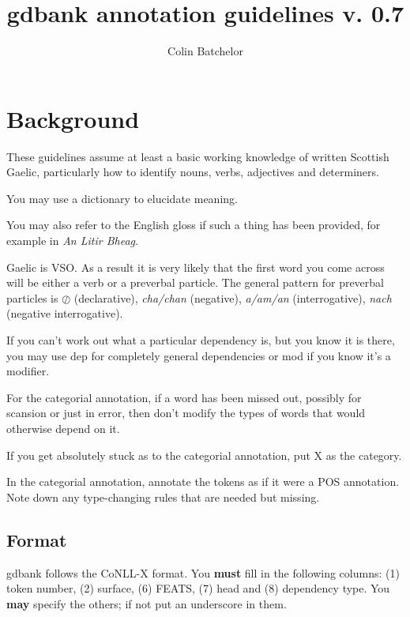 \documentclass[a4paper]{article}
\begin{document}
\title{gdbank annotation guidelines v. 0.7}
\author{Colin Batchelor}
\maketitle

\section{Background}

These guidelines assume at least a basic working knowledge of written Scottish Gaelic, particularly how to identify nouns, verbs, adjectives and determiners.

 You may use a dictionary to elucidate meaning.

 You may also refer to the English gloss if such a thing has been provided, for example in {\it An Litir Bheag}.

 Gaelic is VSO. As a result it is very likely that the first word you come across will be either a verb or a preverbal particle.
The general pattern for preverbal particles is $\oslash$ (declarative), \textit{cha/chan} (negative), \textit{a/am/an} (interrogative), \textit{nach} (negative interrogative).

 If you can't work out what a particular dependency is, but you know it is there, you may use dep for completely general dependencies or mod if you know it's a modifier.

 For the categorial annotation, if a word has been missed out, possibly for scansion or just in error, then don't modify the types of words that would otherwise depend on it.

 If you get absolutely stuck as to the categorial annotation, put X as the category.

 In the categorial annotation, annotate the tokens as if it were a POS annotation. Note down any type-changing rules that are needed but missing.

\subsection{Format}

 gdbank follows the CoNLL-X format.
You \textbf{must} fill in the following columns: (1) token number, (2) surface, (6) FEATS, (7) head and (8) dependency type.
You \textbf{may} specify the others; if not put an underscore in them.
\end{document}
